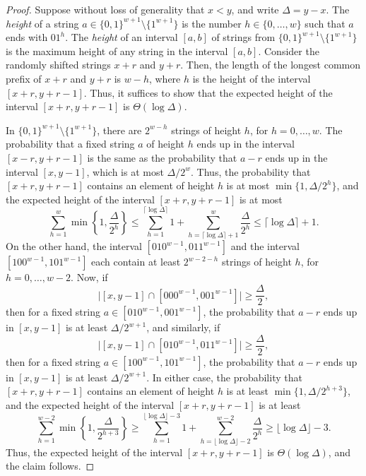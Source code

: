 \documentclass[a4paper,11pt]{article}
\newcommand{\?}{\mskip1.5mu}
\begin{document}
\begin{proof}
Suppose without loss of generality that $x < y$, 
and write $\Delta = y - x$.
The \emph{height} of a string 
$a \in \{0, 1\}^{w+1} \setminus \{ 1^{w+1}\}$
is the number $h \in \{0, \dots, w\}$ such that $a$ 
ends with $01^{h}$. The \emph{height} of an interval
$[a, b]$ of strings from $\{0, 1\}^{w+1} \setminus \{ 1^{w+1}\}$ 
is the maximum height of any string in the interval
$[a, b]$. Consider the randomly shifted strings
$x + r$ and $y + r$. Then, the length of the 
longest common prefix of $x + r$ and $y + r$ is $w - h$,
where $h$ is the height of the interval $[x + r, y + r - 1]$.
Thus, it suffices to show that the expected height of the
interval $[x + r, y + r - 1]$ is $\Theta(\log \Delta)$.

In $\{0, 1\}^{w+1} \setminus \{ 1^{w+1}\}$, there are
$2^{w - h}$ strings of height $h$, for $h = 0, \dots, w$.
The probability that a fixed string $a$ of height $h$
ends up in the interval $[x - r, y + r - 1]$ is the same
as the probability that $a - r$ ends up in the interval 
$[x, y - 1]$, which is at most $\Delta/2^w$. Thus,
the probability that $[x + r, y + r - 1]$ contains
an element of height $h$ is at most 
$\min \{1, \Delta/2^h\}$, and 
the expected height of the interval 
$[x + r, y + r - 1]$  is at most
\[
\sum_{h = 1}^w  \min \left\{1, \frac{\Delta}{2^h} \right\} \leq 
\sum_{h = 1}^{\lceil \log \Delta \rceil } 1 +  
\sum_{h =  \lceil \log \Delta \rceil  + 1 }^w  \frac{\Delta}{2^h} 
\leq  \lceil \log \Delta \rceil  +  1.
\]
On the other hand, the interval $[010^{w - 1}, 011^{w - 1}]$ and the interval
$[100^{w - 1}, 101^{w - 1}]$ each contain at least $2^{w - 2 - h}$ strings
of height $h$, for $h = 0, \dots, w - 2$. Now, if 
\[
\big\vert [x, y -1] \cap [000^{w - 1}, 001^{w - 1}] \big\vert
\geq \frac{\Delta}{2},
\]
then for a fixed string
$a \in [010^{w - 1}, 001^{w - 1}]$, the probability that $a - r$
ends up in $[x, y - 1]$ is at least $\Delta/2^{w + 1}$, and similarly,
if 
\[
\big\vert [x, y -1] \cap [010^{w - 1}, 011^{w - 1}] \big \vert 
\geq \frac{\Delta}{2},
\]
then for a fixed string
$a \in [100^{w - 1}, 101^{w - 1}]$, the probability that $a - r$
ends up in $[x, y - 1]$ is at least $\Delta/2^{w + 1}$.
In either case,
the probability that $[x + r, y + r - 1]$ contains
an element of height $h$ is at least 
$\min \{1, \Delta/2^{h + 3}\}$, and 
the expected height of the interval 
$[x + r, y + r - 1]$  is at least
\[
\sum_{h = 1}^{w - 2}  \min \left\{1, \frac{\Delta}{2^{h + 3}} \right\} \geq 
\sum_{h = 1}^{\lfloor \log \Delta \rfloor - 3 } 1 +  
\sum_{h =  \lfloor \log \Delta \rfloor  -2 }^{w - 2}  \frac{\Delta}{2^h} 
\geq  \lfloor \log \Delta \rfloor - 3.
\]
Thus, the expected height of the interval $[x + r, y + r - 1]$
is $\Theta(\log \Delta)$, and the claim follows.
\end{proof}
\end{document}
